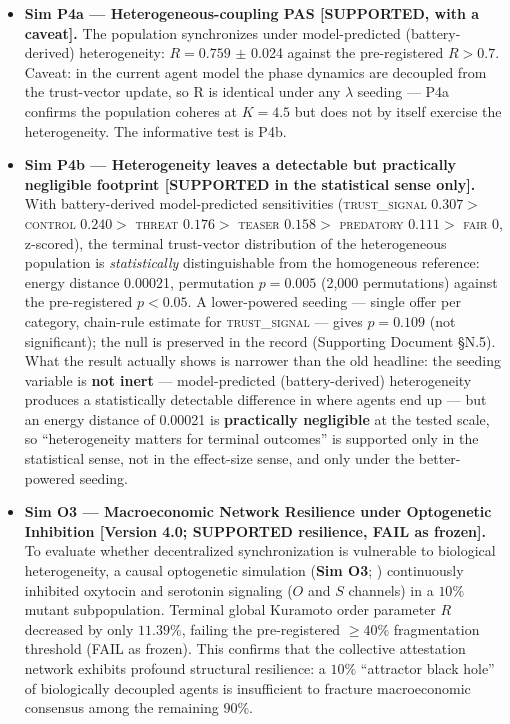 \documentclass[
]{article}
\begin{document}
\begin{itemize}
\item
  \textbf{Sim P4a --- Heterogeneous-coupling PAS {[}SUPPORTED, with a
  caveat{]}.} The population synchronizes under model-predicted
  (battery-derived) heterogeneity: \(R = 0.759\) \(\pm\) 0.024 against
  the pre-registered \(R > 0.7.\) Caveat: in the current agent model the
  phase dynamics are decoupled from the trust-vector update, so R is
  identical under any \(\lambda\) seeding --- P4a confirms the
  population coheres at \(K = 4.5\) but does not by itself exercise the
  heterogeneity. The informative test is P4b.
\item
  \textbf{Sim P4b --- Heterogeneity leaves a detectable but practically
  negligible footprint {[}SUPPORTED in the statistical sense only{]}.}
  With battery-derived model-predicted sensitivities
  (\textsc{trust\_signal} \(0.307 >\) \textsc{control} \(0.240 >\)
  \textsc{threat} \(0.176 >\) \textsc{teaser} \(0.158 >\)
  \textsc{predatory} \(0.111 >\) \textsc{fair} \(0\), z-scored), the
  terminal trust-vector distribution of the heterogeneous population is
  \emph{statistically} distinguishable from the homogeneous reference:
  energy distance 0.00021, permutation \(p = 0.005\) (2,000
  permutations) against the pre-registered \(p < 0.05.\) A lower-powered
  seeding --- single offer per category, chain-rule estimate for
  \textsc{trust\_signal} --- gives \(p = 0.109\) (not significant); the
  null is preserved in the record (Supporting Document §N.5). What the
  result actually shows is narrower than the old headline: the seeding
  variable is \textbf{not inert} --- model-predicted (battery-derived)
  heterogeneity produces a statistically detectable difference in where
  agents end up --- but an energy distance of 0.00021 is
  \textbf{practically negligible} at the tested scale, so
  ``heterogeneity matters for terminal outcomes'' is supported only in
  the statistical sense, not in the effect-size sense, and only under
  the better-powered seeding.
\item
  \textbf{Sim O3 --- Macroeconomic Network Resilience under Optogenetic
  Inhibition {[}Version 4.0; SUPPORTED resilience, FAIL as frozen{]}.}
  To evaluate whether decentralized synchronization is vulnerable to
  biological heterogeneity, a causal optogenetic simulation (\textbf{Sim
  O3}; ) continuously inhibited oxytocin and serotonin signaling (\(O\)
  and \(S\) channels) in a \(10\%\) mutant subpopulation. Terminal
  global Kuramoto order parameter \(R\) decreased by only \(11.39\%\),
  failing the pre-registered \(\ge 40\%\) fragmentation threshold (FAIL
  as frozen). This confirms that the collective attestation network
  exhibits profound structural resilience: a \(10\%\) ``attractor black
  hole'' of biologically decoupled agents is insufficient to fracture
  macroeconomic consensus among the remaining \(90\%\).
\end{itemize}
\end{document}
